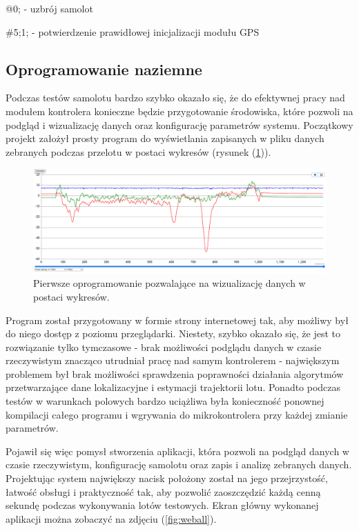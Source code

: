 \documentclass[12pt, a4paper]{article}
\let\oldref\ref
\renewcommand{\ref}[1]{(\oldref{#1})}
\begin{document}
@0; - uzbrój samolot

\#5;1; - potwierdzenie prawidłowej inicjalizacji modułu GPS

\FloatBarrier
\subsection{Oprogramowanie naziemne}
Podczas testów samolotu bardzo szybko okazało się, że do efektywnej pracy nad modułem kontrolera konieczne będzie przygotowanie środowiska, które pozwoli na podgląd i wizualizację danych oraz konfigurację parametrów systemu. Początkowy projekt założył prosty program do wyświetlania zapisanych w pliku danych zebranych podczas przelotu w postaci wykresów (rysunek \ref{fig:staryprogram}).

 \begin{figure}[ht]
    \centering
    \includegraphics[width=1\textwidth]{starysystem}
    \caption{Pierwsze oprogramowanie pozwalające na wizualizację danych w postaci wykresów.}
    \label{fig:staryprogram}
\end{figure}

Program został przygotowany w formie strony internetowej tak, aby możliwy był do niego dostęp z poziomu przeglądarki. Niestety, szybko okazało się, że jest to rozwiązanie tylko tymczasowe - brak możliwości podglądu danych w czasie rzeczywistym znacząco utrudniał pracę nad samym kontrolerem - największym problemem był brak możliwości sprawdzenia poprawności działania algorytmów przetwarzające dane lokalizacyjne i estymacji trajektorii lotu. Ponadto podczas testów w warunkach polowych bardzo uciążliwa była konieczność ponownej kompilacji całego programu i wgrywania do mikrokontrolera przy każdej zmianie parametrów. 

Pojawił się więc pomysł stworzenia aplikacji, która pozwoli na podgląd danych w czasie rzeczywistym, konfigurację samolotu oraz zapis i analizę zebranych danych. Projektując system największy nacisk położony został na jego przejrzystość, łatwość obsługi i praktyczność tak, aby pozwolić zaoszczędzić każdą cenną sekundę podczas wykonywania lotów testowych. Ekran główny wykonanej aplikacji można zobaczyć na zdjęciu \ref{fig:weball}.
\end{document}
